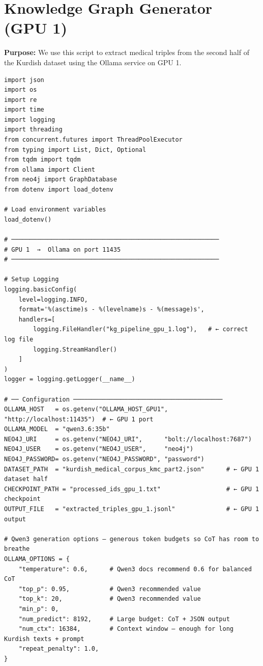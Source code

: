 \documentclass[11pt]{article}
\begin{document}
\section{Knowledge Graph Generator (GPU 1)} \label{sec:gengpu1}
\textbf{Purpose:} We use this script to extract medical triples from the second half of the Kurdish dataset using the Ollama service on GPU 1.

\begin{lstlisting}[style=pythoncode, caption={kg\_generator\_gpu\_1.py}]
import json
import os
import re
import time
import logging
import threading
from concurrent.futures import ThreadPoolExecutor
from typing import List, Dict, Optional
from tqdm import tqdm
from ollama import Client
from neo4j import GraphDatabase
from dotenv import load_dotenv

# Load environment variables
load_dotenv()

# ─────────────────────────────────────────────────────────
# GPU 1  →  Ollama on port 11435
# ─────────────────────────────────────────────────────────

# Setup Logging
logging.basicConfig(
    level=logging.INFO,
    format='%(asctime)s - %(levelname)s - %(message)s',
    handlers=[
        logging.FileHandler("kg_pipeline_gpu_1.log"),   # ← correct log file
        logging.StreamHandler()
    ]
)
logger = logging.getLogger(__name__)

# ── Configuration ─────────────────────────────────────────
OLLAMA_HOST   = os.getenv("OLLAMA_HOST_GPU1", "http://localhost:11435")  # ← GPU 1 port
OLLAMA_MODEL  = "qwen3.6:35b"
NEO4J_URI     = os.getenv("NEO4J_URI",      "bolt://localhost:7687")
NEO4J_USER    = os.getenv("NEO4J_USER",     "neo4j")
NEO4J_PASSWORD= os.getenv("NEO4J_PASSWORD", "password")
DATASET_PATH  = "kurdish_medical_corpus_kmc_part2.json"      # ← GPU 1 dataset half
CHECKPOINT_PATH = "processed_ids_gpu_1.txt"                  # ← GPU 1 checkpoint
OUTPUT_FILE   = "extracted_triples_gpu_1.jsonl"              # ← GPU 1 output

# Qwen3 generation options – generous token budgets so CoT has room to breathe
OLLAMA_OPTIONS = {
    "temperature": 0.6,      # Qwen3 docs recommend 0.6 for balanced CoT
    "top_p": 0.95,           # Qwen3 recommended value
    "top_k": 20,             # Qwen3 recommended value
    "min_p": 0,
    "num_predict": 8192,     # Large budget: CoT + JSON output
    "num_ctx": 16384,        # Context window – enough for long Kurdish texts + prompt
    "repeat_penalty": 1.0,
}


\end{lstlisting}
\end{document}
